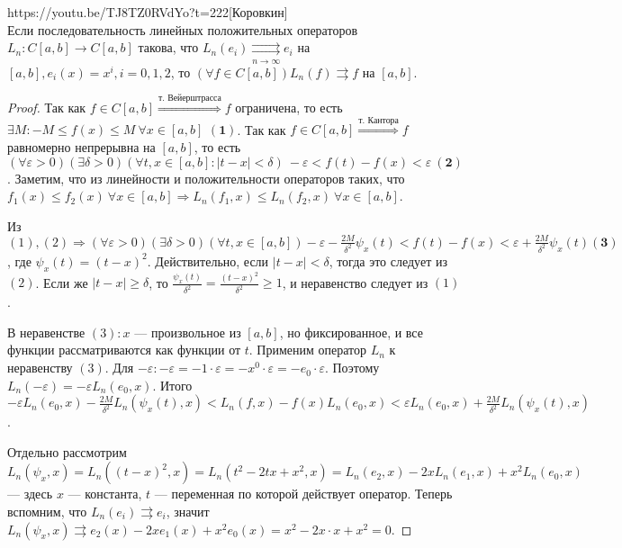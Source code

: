 \begin{linkthm}{https://youtu.be/TJ8TZ0RVdYo?t=222}[Коровкин]\ \\
	Если последовательность линейных положительных операторов $L_n:C[a,b]\to C[a,b]$ такова, что $L_n(e_i)\underset{n\to\infty}{\rightrightarrows} e_i$ на $[a,b], e_i(x)=x^i, i=0,1,2$, то $(\forall f\in C[a,b]) L_n(f)\rightrightarrows f$ на $[a,b]$.
\end{linkthm}
\begin{proof}
Так как $f\in C[a,b]\overset{\text{т. Вейерштрасса}}{\Rightarrow} f$ ограничена, то есть $\exists M: {-M\leqslant f(x)\leqslant M}\ \forall x\in [a,b]$ $\boldsymbol{(1)}$. Так как $f\in C[a,b]\overset{\text{т. Кантора}}{\Rightarrow} f$ равномерно непрерывна на $[a,b]$, то есть $(\forall\varepsilon>0)(\exists\delta>0)(\forall t,x\in[a,b]: |t-x|<\delta)\ -\varepsilon<f(t)-f(x)<\varepsilon\ \boldsymbol{(2)}$.
Заметим, что из линейности и положительности операторов таких, что $f_1(x)\leqslant f_2(x)\ \forall x\in[a,b]\Rightarrow {L_n(f_1,x)\leqslant L_n(f_2,x)\ \forall x\in [a,b]}$. 

Из $(1), (2) \Rightarrow (\forall\varepsilon>0)(\exists\delta>0)(\forall t, x\in[a,b]) -\varepsilon-\frac{2M}{\delta^2}\psi_x(t)<f(t)-f(x)<\varepsilon+\frac{2M}{\delta^2}\psi_x(t) \boldsymbol{(3)}$, где $\psi_x(t)=(t-x)^2$. Действительно, если $|t-x|<\delta$, тогда это следует из $(2)$. Если же $|t-x|\geqslant\delta$, то $\frac{\psi_x(t)}{\delta^2}=\frac{(t-x)^2}{\delta^2}\geqslant 1$, и неравенство следует из $(1)$.

В неравенстве $(3): x$ --- произвольное из $[a,b]$, но фиксированное, и все функции рассматриваются как функции от $t$. Применим оператор $L_n$ к неравенству $(3)$. Для $-\varepsilon: -\varepsilon = -1\cdot\varepsilon = -x^0\cdot\varepsilon = -e_0\cdot\varepsilon$. Поэтому $L_n(-\varepsilon) = -\varepsilon L_n(e_0,x)$. Итого \\$-\varepsilon L_n(e_0,x)-\frac{2M}{\delta^2}L_n(\psi_x(t),x)<L_n(f,x)-f(x)L_n(e_0,x)<\varepsilon L_n(e_0,x)+\frac{2M}{\delta^2}L_n(\psi_x(t),x)$.

Отдельно рассмотрим $L_n(\psi_x,x)=L_n((t-x)^2,x)=L_n(t^2-2tx+x^2,x)={L_n(e_2,x)-2xL_n(e_1,x)+x^2L_n(e_0,x)}$ --- здесь $x$ --- константа, $t$ --- переменная по которой действует оператор. Теперь вспомним, что $L_n(e_i)\rightrightarrows e_i$, значит $L_n(\psi_x,x)\rightrightarrows e_2(x)-2xe_1(x)+x^2e_0(x) = x^2-2x\cdot x+x^2=0$.


\end{proof}
